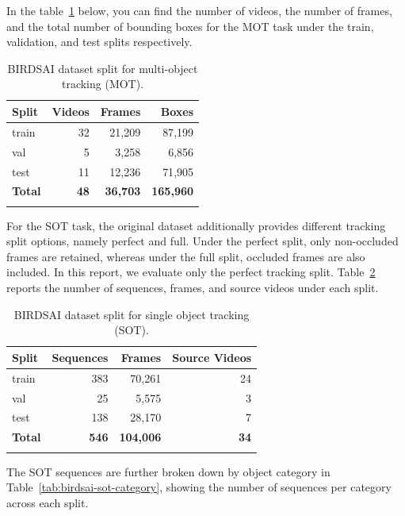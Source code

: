 \documentclass[11pt]{article}
\begin{document}
In the table~\ref{tab:birdsai-mot-split} below, you can find the number of videos, the number of frames, and the total number of bounding boxes for the MOT task under the train, validation, and test splits respectively.


\renewcommand{\arraystretch}{1.3}
\begin{longtable}[c]{@{}lrrr@{}}
\rowcolor{gray!20}
\textbf{Split} & \textbf{Videos} & \textbf{Frames} & \textbf{Boxes} \\
\midrule
\endhead
train          & 32     & 21{,}209 & 87{,}199  \\
val            & 5      &  3{,}258 &  6{,}856  \\
test           & 11     & 12{,}236 & 71{,}905  \\
\midrule
\textbf{Total} & \textbf{48} & \textbf{36{,}703} & \textbf{165{,}960} \\
\caption{BIRDSAI dataset split for multi-object tracking (MOT).\label{tab:birdsai-mot-split}}\\
\end{longtable}
\renewcommand{\arraystretch}{1}

For the SOT task, the original dataset additionally provides different tracking split options, namely perfect and full. Under the perfect split, only non-occluded frames are retained, whereas under the full split, occluded frames are also included. In this report, we evaluate only the perfect tracking split. Table~\ref{tab:birdsai-sot-split} reports the number of sequences, frames, and source videos under each split.

\renewcommand{\arraystretch}{1.3}
\begin{longtable}[c]{@{}lrrr@{}}
\rowcolor{gray!20}
\textbf{Split} & \textbf{Sequences} & \textbf{Frames} & \textbf{Source Videos} \\
\midrule
\endhead
train          & 383     & 70{,}261  & 24 \\
val            &  25     &  5{,}575  &  3 \\
test           & 138     & 28{,}170  &  7 \\
\midrule
\textbf{Total} & \textbf{546} & \textbf{104{,}006} & \textbf{34} \\
\caption{BIRDSAI dataset split for single object tracking (SOT).\label{tab:birdsai-sot-split}}\\
\end{longtable}
\renewcommand{\arraystretch}{1}

The SOT sequences are further broken down by object category in Table~\ref{tab:birdsai-sot-category}, showing the number of sequences per category across each split.
\end{document}
